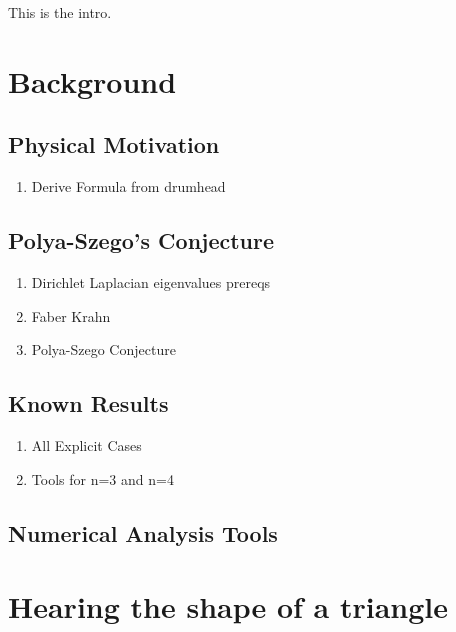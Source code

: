 \documentclass[12pt]{report}
\numberwithin{definition}{section}
\begin{document}
  
This is the intro.
	

\break









\chapter{Background}

\break
\section {Physical Motivation}

\begin{enumerate}
  \item Derive Formula from drumhead
\end{enumerate}
 
\break

\section {Polya-Szego's Conjecture}

\begin{enumerate}
  \item Dirichlet Laplacian eigenvalues prereqs
  \item Faber Krahn
  \item Polya-Szego Conjecture
\end{enumerate}

\break

\section{Known Results}

\begin{enumerate}
  \item All Explicit Cases
  \item Tools for n=3 and n=4
\end{enumerate}

\break

\section {Numerical Analysis Tools}

\chapter {Hearing the shape of a triangle}
\break
\end{document}
